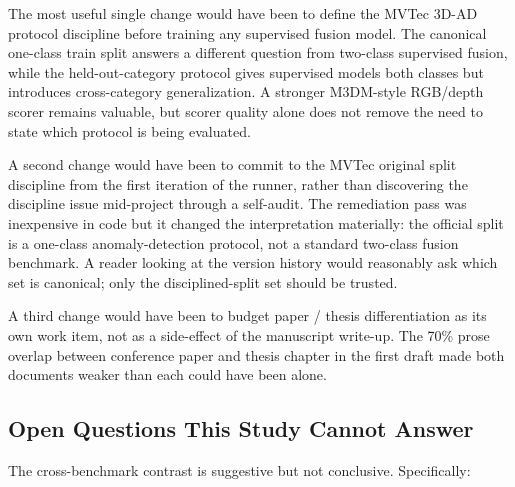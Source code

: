 \documentclass[11pt]{article}
\begin{document}
The most useful single change would have been to define the MVTec 3D-AD
protocol discipline before training any supervised fusion model. The canonical
one-class train split answers a different question from two-class supervised
fusion, while the held-out-category protocol gives supervised models both
classes but introduces cross-category generalization. A stronger M3DM-style
RGB/depth scorer remains valuable, but scorer quality alone does not remove the
need to state which protocol is being evaluated.

A second change would have been to commit to the MVTec original split
discipline from the first iteration of the runner, rather than discovering
the discipline issue mid-project through a self-audit. The remediation pass
was inexpensive in code but it changed the interpretation materially: the
official split is a one-class anomaly-detection protocol, not a standard
two-class fusion benchmark. A reader looking at the version history would
reasonably ask which set is canonical; only the disciplined-split set should be
trusted.

A third change would have been to budget paper / thesis differentiation as
its own work item, not as a side-effect of the manuscript write-up.
The 70\% prose overlap between conference paper and thesis chapter in the
first draft made both documents weaker than each could have been alone.

\subsection{Open Questions This Study Cannot Answer}

The cross-benchmark contrast is suggestive but not conclusive. Specifically:
\end{document}
